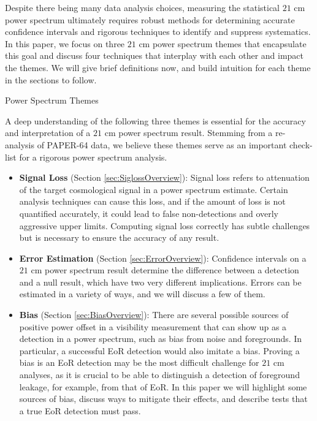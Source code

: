 \documentclass[preprint2,numberedappendix,tighten]{aastex6}  %
\begin{document}
Despite there being many data analysis choices, measuring the statistical $21$ cm power spectrum ultimately requires robust 
methods for determining accurate confidence intervals and rigorous techniques to identify and suppress systematics.  In this 
paper, we focus on three $21$ cm power spectrum themes that encapsulate this goal and discuss four techniques that interplay 
with each other and impact the themes. We will give brief definitions now, and build intuition for each theme in the sections to 
follow.

\begin{center}
Power Spectrum Themes
\end{center}

A deep understanding of the following three themes is essential for the accuracy and interpretation of a $21$ cm power 
spectrum result. Stemming from a re-analysis of PAPER-64 data, we believe these themes serve as an important check-list for 
a rigorous power spectrum analysis.
\begin{itemize}
\item \textbf{Signal Loss} (Section \ref{sec:SiglossOverview}): Signal loss refers to attenuation of the target cosmological signal 
in a power spectrum estimate. Certain analysis techniques can cause this loss, and if the amount of loss is not quantified accurately, it could lead to false non-detections and overly aggressive upper limits. Computing signal loss correctly has subtle challenges but is necessary to ensure the accuracy of any result. 
\item \textbf{Error Estimation} (Section \ref{sec:ErrorOverview}): Confidence intervals on a $21$ cm power spectrum result 
determine the difference between a detection and a null result, which have two very different implications. Errors can be 
estimated in a variety of ways, and we will discuss a few of them.
\item \textbf{Bias} (Section \ref{sec:BiasOverview}): There are several possible sources of positive power offset in a visibility 
measurement that can show up as a detection in a power spectrum, such as bias from noise and foregrounds. In particular, a 
successful EoR detection would also imitate a bias. Proving a bias is an EoR detection may be the most difficult challenge for $21$ cm 
analyses, as it is crucial to be able to distinguish a detection of foreground leakage, for example, from that of EoR. In this paper 
we will highlight some sources of bias, discuss ways to mitigate their effects, and describe tests that a true EoR detection must 
pass.
\end{itemize}
\end{document}
